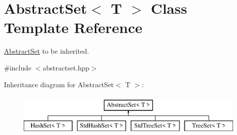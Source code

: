 \hypertarget{class_abstract_set}{\section{Abstract\-Set$<$ T $>$ Class Template Reference}
\label{class_abstract_set}
}


\hyperlink{class_abstract_set}{Abstract\-Set} to be inherited.  




{\ttfamily \#include $<$abstractset.\-hpp$>$}

Inheritance diagram for Abstract\-Set$<$ T $>$\-:\begin{figure}[H]
\begin{center}
\leavevmode
\includegraphics[height=2.000000cm]{class_abstract_set}
\end{center}
\end{figure}
